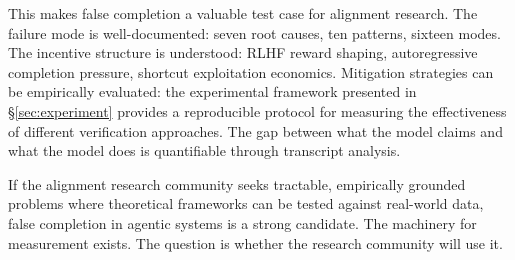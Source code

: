This makes false completion a valuable test case for alignment research.
The failure mode is well-documented: seven root causes, ten patterns, sixteen modes.
The incentive structure is understood: RLHF reward shaping, autoregressive completion pressure, shortcut exploitation economics.
Mitigation strategies can be empirically evaluated: the experimental framework presented in \S\ref{sec:experiment} provides a reproducible protocol for measuring the effectiveness of different verification approaches.
The gap between what the model claims and what the model does is quantifiable through transcript analysis.

If the alignment research community seeks tractable, empirically grounded problems where theoretical frameworks can be tested against real-world data, false completion in agentic systems is a strong candidate.
The machinery for measurement exists.
The question is whether the research community will use it.
